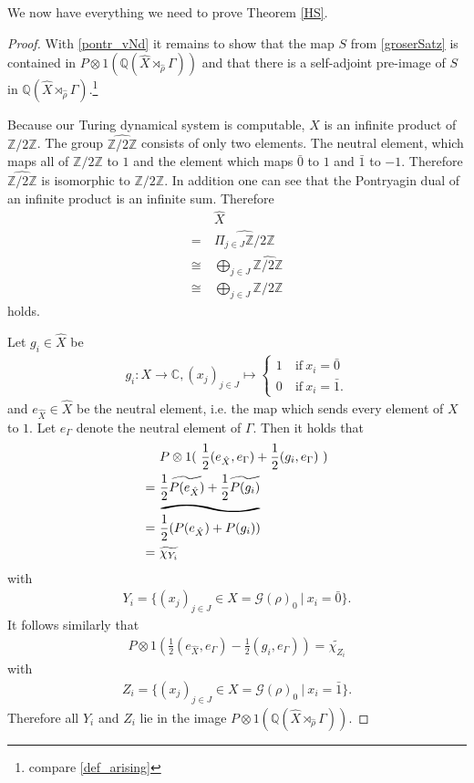 \documentclass[12pt,a4paper]{scrartcl}
\theoremstyle{plain}
\theoremstyle{definition}
\newcommand{\C}{\mathbb{C}} %
\newcommand{\Q}{\mathbb{Q}} %
\newcommand{\2}{\mathbb{Z} / 2 \mathbb{Z}}
\newcommand{\G}{\mathcal{G}}
\newcommand{\1}{\bar{1}}
\newcommand{\0}{\bar{0}}
\newcommand{\reallywidetilde}[1]{\ThisStyle{%
		\setbox0=\hbox{$\SavedStyle#1$}%
		\stackengine{-.1\LMpt}{$\SavedStyle#1$}{%
			\stretchto{\scaleto{\SavedStyle\mkern.2mu\AC}{.5150\wd0}}{.6\ht0}%
		}{O}{c}{F}{T}{S}%
}}
\begin{document}
We now have everything we need to prove Theorem \ref{HS}.
\main*
\begin{proof}\label{image_of_P}
	With \ref{pontr_vNd} it remains to show that the map $S$ from \ref{groserSatz} is contained in $P \otimes 1(\Q (\hat{X} \rtimes_{\hat{\rho}} \Gamma))$ and that there is a self-adjoint pre-image of $S$ in $\Q (\hat{X} \rtimes_{\hat{\rho}} \Gamma)$.\footnote{compare \ref{def_arising}}
	
	Because our Turing dynamical system is computable, $X$ is an infinite product of $\2$. The group $\widehat{\2}$ consists of only two elements. The neutral element, which maps all of $\2$ to $1$ and the element which maps $\0$ to $1$ and $\1$ to $-1$. Therefore $\widehat{\2}$ is isomorphic to $\2$. In addition one can see  that the Pontryagin dual of an infinite product is an infinite sum. Therefore 
	\begin{align*}
		 &~\hat{X} \\
		=&~ \widehat{\Pi_{j \in J} \2} \\
		\cong&~ \bigoplus_{j \in J} \widehat{\2} \\
		\cong&~ \bigoplus_{j \in J} \2
	\end{align*}
	holds.
		
	Let $g_i \in \hat{X}$ be
	\begin{align*}
		g_i\colon X \to \C, (x_j)_{j \in J} \mapsto \begin{cases}
			1 &~ \text{if} \ x_i = \0 \\
			0 &~ \text{if} \ x_i = \1.
		\end{cases}
	\end{align*} 
	and $e_{\hat{X}} \in \hat{X}$ be the neutral element, i.e. the map which sends every element of $X$ to $1$. Let $e_{\Gamma}$ denote the neutral element of $\Gamma$. Then it holds that
	\begin{align*}
		 &~ P \otimes 1(~\frac{1}{2} (e_{\hat{X}}, e_{\Gamma}) + \frac{1}{2}(g_i, e_{\Gamma})~) \\
		=&~ \frac{1}{2} \widetilde{P(e_{\hat{X}})} + \frac{1}{2} \widetilde{P(g_i)} \\
		=&~ \reallywidetilde{\frac{1}{2}(P(e_{\hat{X}}) + P(g_i))} \\
		=&~ \widetilde{\chi_{Y_i}}
	\end{align*}
	with
	\begin{align*}
		Y_i = \{(x_j)_{j \in J} \in X = \G (\rho)_0~|~ x_i = \0\}.
	\end{align*} 
	It follows similarly that 
	\begin{align*}
		P \otimes 1(\frac{1}{2} (e_{\hat{X}}, e_{\Gamma}) - \frac{1}{2}(g_i, e_{\Gamma})) = \widetilde{\chi_{Z_i}}
	\end{align*}
	with
	\begin{align*}
		Z_i = \{(x_j)_{j \in J} \in X = \G (\rho)_0~|~ x_i = \1\}.
	\end{align*}
	Therefore all $Y_i$ and $Z_i$ lie in the image $P \otimes 1(\Q (\hat{X} \rtimes_{\hat{\rho}} \Gamma))$.
	

\end{proof}
\end{document}
